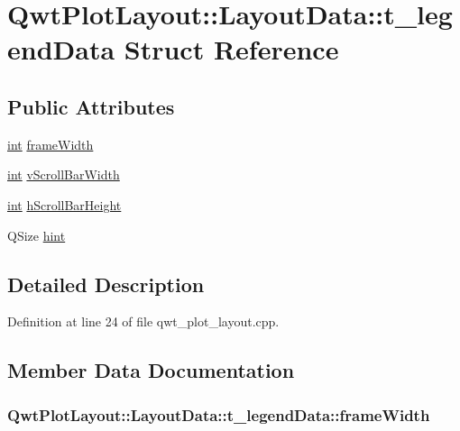 \hypertarget{struct_qwt_plot_layout_1_1_layout_data_1_1t__legend_data}{\section{Qwt\-Plot\-Layout\-:\-:Layout\-Data\-:\-:t\-\_\-legend\-Data Struct Reference}
\label{struct_qwt_plot_layout_1_1_layout_data_1_1t__legend_data}
}
\subsection*{Public Attributes}
\begin{DoxyCompactItemize}
\item 
\hyperlink{ioapi_8h_a787fa3cf048117ba7123753c1e74fcd6}{int} \hyperlink{struct_qwt_plot_layout_1_1_layout_data_1_1t__legend_data_a0cdd2068c0416ff108ad07e243f9f019}{frame\-Width}
\item 
\hyperlink{ioapi_8h_a787fa3cf048117ba7123753c1e74fcd6}{int} \hyperlink{struct_qwt_plot_layout_1_1_layout_data_1_1t__legend_data_a871d7cf7ee8f2931c2edf0b63273bdcd}{v\-Scroll\-Bar\-Width}
\item 
\hyperlink{ioapi_8h_a787fa3cf048117ba7123753c1e74fcd6}{int} \hyperlink{struct_qwt_plot_layout_1_1_layout_data_1_1t__legend_data_a6736ae026a3f7c170b6ca8a021e73df6}{h\-Scroll\-Bar\-Height}
\item 
Q\-Size \hyperlink{struct_qwt_plot_layout_1_1_layout_data_1_1t__legend_data_a9d45ea68317dd739fbb0f909e412ea71}{hint}
\end{DoxyCompactItemize}


\subsection{Detailed Description}


Definition at line 24 of file qwt\-\_\-plot\-\_\-layout.\-cpp.



\subsection{Member Data Documentation}
\hypertarget{struct_qwt_plot_layout_1_1_layout_data_1_1t__legend_data_a0cdd2068c0416ff108ad07e243f9f019}{
\subsubsection[{frame\-Width}]{ Qwt\-Plot\-Layout\-::\-Layout\-Data\-::t\-\_\-legend\-Data\-::frame\-Width}}\label{struct_qwt_plot_layout_1_1_layout_data_1_1t__legend_data_a0cdd2068c0416ff108ad07e243f9f019}



